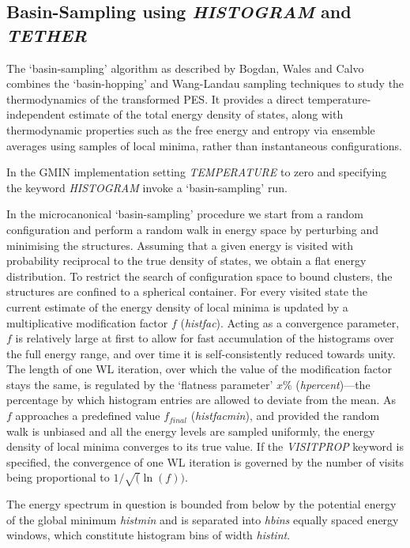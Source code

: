 \documentclass[12pt,a4paper,dvips]{article}
\begin{document}
\subsection{Basin-Sampling using {\it HISTOGRAM} and {\it TETHER}}

The `basin-sampling' algorithm as described by Bogdan, Wales and Calvo \cite{BogdanWC06} 
combines the `basin-hopping' \cite{walesd97a} and Wang-Landau 
sampling techniques \cite{wangl01} to study the thermodynamics of the transformed PES.
It provides a direct temperature-independent estimate of the total energy density of states,
along with thermodynamic properties such as the free energy and entropy via ensemble averages using
samples of local minima, rather than instantaneous configurations.

In the GMIN implementation setting {\it TEMPERATURE}
to zero and specifying the keyword {\it HISTOGRAM} invoke a `basin-sampling' run. 

In the microcanonical `basin-sampling' 
procedure we start from a random configuration and perform a random walk in energy space
by perturbing and minimising the structures. Assuming that a given energy is visited with probability
reciprocal to the true density of states, 
we obtain a flat energy distribution. To restrict the search of configuration
space to  bound clusters, the structures are confined to a spherical container. 
For every visited state the current estimate of the energy density of local minima
is updated by a multiplicative modification factor $f$ ({\it histfac}). 
Acting as a convergence parameter, $f$ is relatively large at first to allow for
fast accumulation of the histograms over the full energy range, 
and over time it is self-consistently reduced towards unity.
The length of one WL iteration, over which the value of the
modification factor stays the same, is regulated by the 
`flatness parameter' $x \%$ ({\it hpercent})---the percentage by which histogram entries
are allowed to deviate from the mean. As $f$ approaches a predefined 
value $f_{final}$ ({\it histfacmin}), and provided the random walk is unbiased
and all the energy levels are sampled uniformly, the energy density of local
minima converges to its true value. If 
the {\it VISITPROP} keyword is specified, the convergence of one WL iteration is governed by
the number of visits being proportional to $1/\sqrt(\ln(f))$\cite{ZhouB03}.

The energy spectrum in question is bounded from below by the potential energy of the global 
minimum {\it histmin} and is separated into {\it hbins}  
equally spaced energy windows, which constitute histogram bins of width {\it histint}. 
\end{document}
